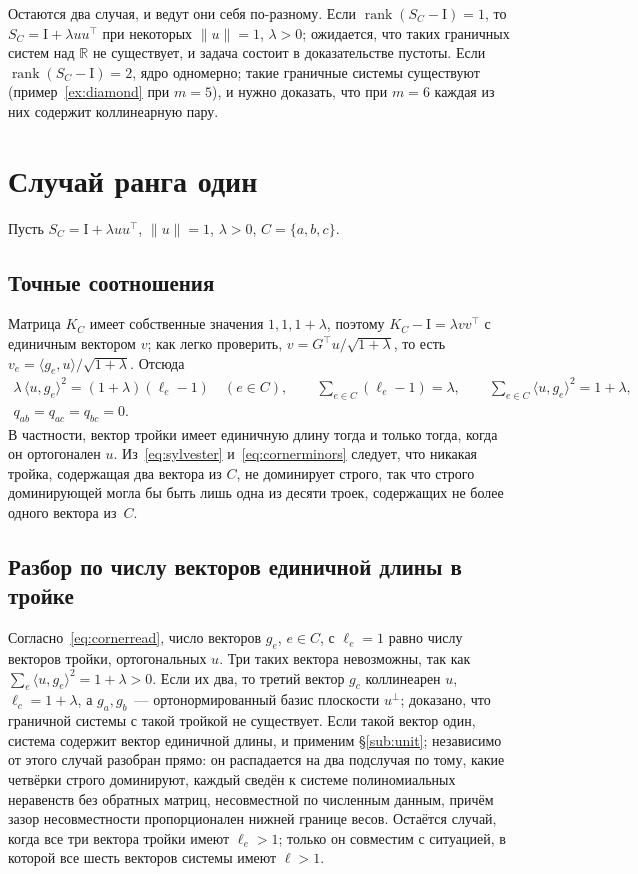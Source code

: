 \documentclass[11pt,a4paper]{article}
\theoremstyle{plain}
\theoremstyle{definition}
\theoremstyle{remark}
\DeclareMathOperator{\rank}{rank}
\newcommand{\RR}{\mathbb{R}}
\newcommand{\Id}{\mathrm{I}}
\newcommand{\T}{^{\!\top}}
\begin{document}
Остаются два случая, и ведут они себя по-разному. Если $\rank(S_C-\Id)=1$,
то $S_C=\Id+\lambda uu\T$ при некоторых $\|u\|=1$, $\lambda>0$; ожидается,
что таких граничных систем над $\RR$ не существует, и задача состоит в
доказательстве пустоты. Если $\rank(S_C-\Id)=2$, ядро одномерно; такие
граничные системы существуют (пример~\ref{ex:diamond} при $m=5$), и нужно
доказать, что при $m=6$ каждая из них содержит коллинеарную пару.

\section{Случай ранга один}\label{sec:corner}

Пусть $S_C=\Id+\lambda uu\T$, $\|u\|=1$, $\lambda>0$, $C=\{a,b,c\}$.

\subsection{Точные соотношения}

Матрица $K_C$ имеет собственные значения $1,1,1+\lambda$, поэтому
$K_C-\Id=\lambda vv\T$ с единичным вектором $v$; как легко проверить,
$v=G\T u/\sqrt{1+\lambda}$, то есть $v_e=\langle g_e,u\rangle/\sqrt{1+\lambda}$.
Отсюда
\begin{gather}
  \lambda\,\langle u,g_e\rangle^2=(1+\lambda)(\ell_e-1)\quad(e\in C),\qquad
  \sum_{e\in C}(\ell_e-1)=\lambda,\qquad
  \sum_{e\in C}\langle u,g_e\rangle^2=1+\lambda, \label{eq:cornerread}\\
  q_{ab}=q_{ac}=q_{bc}=0 . \label{eq:cornerminors}
\end{gather}
В частности, вектор тройки имеет единичную длину тогда и только тогда, когда
он ортогонален $u$. Из~\eqref{eq:sylvester} и~\eqref{eq:cornerminors}
следует, что никакая тройка, содержащая два вектора из $C$, не доминирует
строго, так что строго доминирующей могла бы быть лишь одна из десяти троек,
содержащих не более одного вектора из~$C$.

\subsection{Разбор по числу векторов единичной длины в тройке}

Согласно~\eqref{eq:cornerread}, число векторов $g_e$, $e\in C$, с $\ell_e=1$
равно числу векторов тройки, ортогональных $u$. Три таких вектора невозможны,
так как $\sum_e\langle u,g_e\rangle^2=1+\lambda>0$. Если их два, то третий
вектор $g_c$ коллинеарен $u$, $\ell_c=1+\lambda$, а $g_a,g_b$~---
ортонормированный базис плоскости $u^\perp$; доказано, что граничной системы
с такой тройкой не существует. Если такой вектор один, система содержит
вектор единичной длины, и применим \S\ref{sub:unit}; независимо от этого
случай разобран прямо: он распадается на два подслучая по тому, какие
четвёрки строго доминируют, каждый сведён к системе полиномиальных
неравенств без обратных матриц, несовместной по численным данным, причём
зазор несовместности пропорционален нижней границе весов. Остаётся случай,
когда все три вектора тройки имеют $\ell_e>1$; только он совместим с
ситуацией, в которой все шесть векторов системы имеют $\ell>1$.
\end{document}

